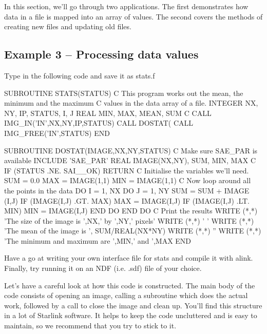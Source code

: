 \documentclass[11pt,nolof]{starlink}
\begin{document}
In this section, we'll go through two applications. The first demonstrates
how data in a file is mapped into an array of values. The second covers
the methods of creating new files and updating old files.

\subsection{Example 3 -- Processing data values}

Type in the following code and save it as \textsf{stats.f}

\begin{small}
\begin{terminalv}
       SUBROUTINE STATS(STATUS)
C This program works out the mean, the minimum and the maximum
C values in the data array of a file.
       INTEGER NX, NY, IP, STATUS, I, J
       REAL MIN, MAX, MEAN, SUM
C
       CALL IMG_IN('IN',NX,NY,IP,STATUS)
       CALL DOSTAT(%
       CALL IMG_FREE('IN',STATUS)
       END

       SUBROUTINE DOSTAT(IMAGE,NX,NY,STATUS)
C Make sure SAE_PAR is available
       INCLUDE 'SAE_PAR'
       REAL IMAGE(NX,NY), SUM, MIN, MAX
C
       IF (STATUS .NE. SAI__OK) RETURN
C Initialise the variables we'll need.
       SUM = 0.0
       MAX = IMAGE(1,1)
       MIN = IMAGE(1,1)
C Now loop around all the points in the data
       DO I = 1, NX
         DO J = 1, NY
           SUM = SUM + IMAGE (I,J)
           IF (IMAGE(I,J) .GT. MAX) MAX = IMAGE(I,J)
           IF (IMAGE(I,J) .LT. MIN) MIN = IMAGE(I,J)
         END DO
       END DO
C Print the results
       WRITE (*,*) 'The size of the image is ',NX,' by ',NY,' pixels'
       WRITE (*,*) ' '
       WRITE (*,*) 'The mean of the image is ', SUM/REAL(NX*NY)
       WRITE (*,*) ''
       WRITE (*,*) 'The minimum and maximum are ',MIN,' and ',MAX
       END
\end{terminalv}
\end{small}

Have a go at writing your own interface file for \textsf{stats} and
compile it with \textsf{alink}. Finally, try running it on an
NDF (i.e. .sdf) file of your choice.

Let's have a careful look at how this code is constructed. The main body
of the code consists of opening an image, calling a subroutine which does the
actual work, followed by a call to close the image and clean up. You'll
find this structure in a lot of Starlink software. It helps to keep the
code uncluttered and is easy to maintain, so we recommend that
you try to stick to it.
\end{document}

